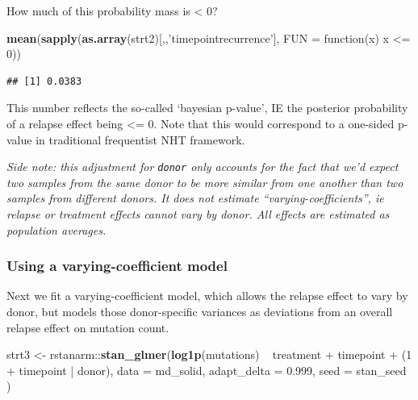 \documentclass[]{article}
\newenvironment{Shaded}{\begin{snugshade}}{\end{snugshade}}
\newcommand{\KeywordTok}[1]{\textcolor[rgb]{0.13,0.29,0.53}{\textbf{{#1}}}}
\newcommand{\DataTypeTok}[1]{\textcolor[rgb]{0.13,0.29,0.53}{{#1}}}
\newcommand{\DecValTok}[1]{\textcolor[rgb]{0.00,0.00,0.81}{{#1}}}
\newcommand{\FloatTok}[1]{\textcolor[rgb]{0.00,0.00,0.81}{{#1}}}
\newcommand{\StringTok}[1]{\textcolor[rgb]{0.31,0.60,0.02}{{#1}}}
\newcommand{\NormalTok}[1]{{#1}}
\begin{document}
How much of this probability mass is \textless{} 0?

\begin{Shaded}
\begin{Highlighting}[]
\KeywordTok{mean}\NormalTok{(}\KeywordTok{sapply}\NormalTok{(}\KeywordTok{as.array}\NormalTok{(strt2)[,,}\StringTok{'timepointrecurrence'}\NormalTok{], }\DataTypeTok{FUN =} \NormalTok{function(x) x <=}\StringTok{ }\DecValTok{0}\NormalTok{))}
\end{Highlighting}
\end{Shaded}

\begin{verbatim}
## [1] 0.0383
\end{verbatim}

This number reflects the so-called `bayesian p-value', IE the posterior
probability of a relapse effect being \textless{}= 0. Note that this
would correspond to a one-sided p-value in traditional frequentist NHT
framework.

\emph{Side note: this adjustment for \texttt{donor} only accounts for
the fact that we'd expect two samples from the same donor to be more
similar from one another than two samples from different donors. It does
not estimate ``varying-coefficients'', ie relapse or treatment effects
cannot vary by donor. All effects are estimated as population averages.}

\subsubsection{Using a varying-coefficient
model}\label{using-a-varying-coefficient-model}

Next we fit a varying-coefficient model, which allows the relapse effect
to vary by donor, but models those donor-specific variances as
deviations from an overall relapse effect on mutation count.

\begin{Shaded}
\begin{Highlighting}[]
\NormalTok{strt3 <-}\StringTok{ }\NormalTok{rstanarm::}\KeywordTok{stan_glmer}\NormalTok{(}\KeywordTok{log1p}\NormalTok{(mutations) ~}\StringTok{ }\NormalTok{treatment +}\StringTok{ }\NormalTok{timepoint +}\StringTok{ }\NormalTok{(}\DecValTok{1} \NormalTok{+}\StringTok{ }\NormalTok{timepoint |}\StringTok{ }\NormalTok{donor),}
                           \DataTypeTok{data =} \NormalTok{md_solid, }
                           \DataTypeTok{adapt_delta =} \FloatTok{0.999}\NormalTok{,}
                           \DataTypeTok{seed =} \NormalTok{stan_seed}
                           \NormalTok{)}
\end{Highlighting}
\end{Shaded}
\end{document}
